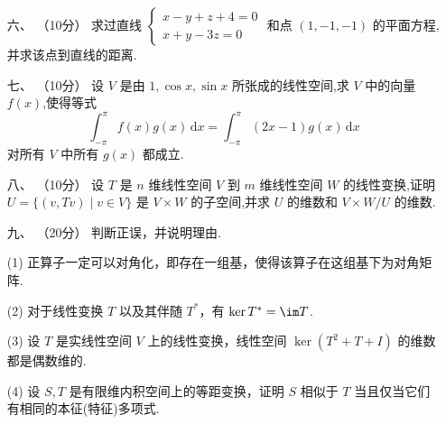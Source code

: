 \begin{enumerate}
    \item[六、]（10分）
    求过直线 $\begin{cases}
        x - y + z + 4 = 0 \\
        x + y - 3z = 0
    \end{cases}$ 和点 $(1,-1,-1)$ 的平面方程,并求该点到直线的距离.

    \item[七、]（10分）
    设 $V$ 是由 $1, \cos x, \sin x$ 所张成的线性空间,求 $V$ 中的向量 $f(x)$,使得等式
    \[
    \int_{-\pi}^{\pi} f(x)g(x) \, \mathrm{d}x = \int_{-\pi}^{\pi} (2x-1)g(x) \, \mathrm{d}x
    \]
    对所有 $V$ 中所有 $g(x)$ 都成立.

    \item[八、]（10分）
    设 $T$ 是 $n$ 维线性空间 $V$ 到 $m$ 维线性空间 $W$ 的线性变换,证明 $U = \{(v,Tv) \mid v \in V\}$ 是 $V \times W$ 的子空间,并求 $U$ 的维数和 $V \times W/U$ 的维数.

    \item[九、]（20分）
    判断正误，并说明理由.
        \item[(1) ] 正算子一定可以对角化，即存在一组基，使得该算子在这组基下为对角矩阵.
        \item[(2) ] 对于线性变换 $T$ 以及其伴随 $T^*$，有 $\ker T^* = \im T$.
        \item[(3) ] 设 $T$ 是实线性空间 $V$ 上的线性变换，线性空间 $\ker(T^2 + T + I)$ 的维数都是偶数维的.
        \item[(4) ] 设 $S,T$ 是有限维内积空间上的等距变换，证明 $S$ 相似于 $T$ 当且仅当它们有相同的本征(特征)多项式.
\end{enumerate}

\clearpage
